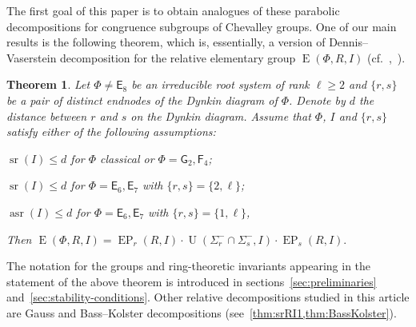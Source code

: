 \documentclass[11pt]{amsart}
\theoremstyle{plain}
\newtheorem{thm}{Theorem}
\numberwithin{equation}{section}
\numberwithin{lemma}{section}
\theoremstyle{definition}
\theoremstyle{remark}
\DeclareMathOperator{\E}{E}
\DeclareMathOperator{\EP}{EP}
\DeclareMathOperator{\U}{U}
\DeclareMathOperator{\sr}{sr}
\DeclareMathOperator{\asr}{asr}
\newcommand{\rE}{\mathsf{E}}
\newcommand{\rF}{\mathsf{F}}
\newcommand{\rG}{\mathsf{G}}
\begin{document}
The first goal of this paper is to obtain analogues of these parabolic decompositions for congruence subgroups of Chevalley groups.
One of our main results is the following theorem, which is, essentially, a version of Dennis--Vaserstein decomposition for the relative elementary group $\E(\Phi, R, I)$
 (cf.~\cite[Theorems~2.5 and~4.1]{St78},~\cite[Theorem~1.2]{Si13}).
\begin{thm}\label{thm:DennisVaserstein}
Let $\Phi \neq \rE_8$ be an irreducible root system of rank $\ell\geqslant 2$ and $\{ r, s \}$ be a pair of distinct endnodes of the Dynkin diagram of $\Phi$.
Denote by $d$ the distance between $r$ and $s$ on the Dynkin diagram.
Assume that $\Phi$, $I$ and $\{r, s\}$ satisfy either of the following assumptions:
\begin{thmlist}
 \item $\sr(I) \leqslant d$ for $\Phi$ classical or $\Phi=\rG_2, \rF_4$;
 \item $\sr(I) \leqslant d$ for $\Phi=\rE_6,\rE_7$ with $\{r, s\} = \{2, \ell\}$;
 \item $\asr(I) \leqslant d$ for $\Phi=\rE_6,\rE_7$ with $\{r, s\} = \{1, \ell \}$, 
\end{thmlist}
Then $\E(\Phi, R, I) = \EP_r(R, I) \cdot \U(\Sigma^-_r \cap \Sigma^-_s, I) \cdot \EP_s(R, I).$
\end{thm}
The notation for the groups and ring-theoretic invariants appearing in the statement of the above theorem is introduced in sections~\ref{sec:preliminaries} and~\ref{sec:stability-conditions}.
Other relative decompositions studied in this article are Gauss and Bass--Kolster decompositions (see~\cref{thm:srRI1,thm:BassKolster}).
\end{document}
